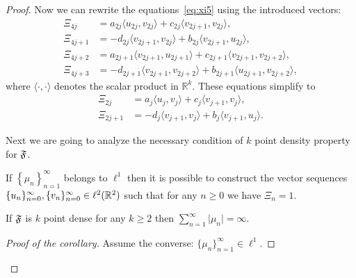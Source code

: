 \begin{proof}
      Now we can rewrite the equations~\eqref{eq:xi5} using the introduced vectors:
      \begin{align*}
        \Xi_{4j} &= a_{2j} \langle u_{2j}, v_{2j}\rangle + c_{2j} \langle v_{2j+1}, v_{2j}\rangle,\\
        \Xi_{4j + 1} &= -d_{2j} \langle v_{2j+1}, v_{2j}\rangle + b_{2j} \langle v_{2j+1}, u_{2j}\rangle,\\
        \Xi_{4j + 2} &= a_{2j+1} \langle v_{2j+1}, u_{2j+1} \rangle + c_{2j+1} \langle v_{2j+1}, v_{2j+2} \rangle,\\
        \Xi_{4j + 3} &= -d_{2j+1} \langle v_{2j+1}, v_{2j+2}\rangle + b_{2j+1} \langle u_{2j+1}, v_{2j+2} \rangle,
      \end{align*}
        where $\langle\cdot, \cdot\rangle$ denotes the scalar product in $\mathbb{R}^k$.
      These equations simplify to
      \begin{equation}
        \label{eq:vector-eqs}
        \begin{aligned}
          \Xi_{2j} &= a_{j} \langle u_{j}, v_{j} \rangle  + c_{j} \langle v_{j+1}, v_{j} \rangle,\\
          \Xi_{2j + 1} &= -d_{j} \langle v_{j+1}, v_{j} \rangle + b_{j} \langle v_{j+1}, u_{j}\rangle.
        \end{aligned}
      \end{equation}

      Next we are going to analyze the necessary condition of $k$ point density property for $\mathfrak{F}$.
      \begin{prop}
        \label{prop:2pd}
        If $\left\{\mu_n\right\}_{n=1}^\infty$ belongs to $\ell^1$ then it is possible to construct
          the vector sequences $\{{u}_n\}_{n=0}^\infty, \{{v}_n\}_{n=0}^\infty \in \ell^2(\mathbb{R}^2)$ such that for any $n \geq 0$ we have $\Xi_n = 1$.
      \end{prop}
      \begin{corol}
        \label{corol:2density}
        If $\mathfrak{F}$ is $k$ point dense for any $k \geq 2$ then $\sum_{n=1}^\infty \lvert\mu_n\rvert = \infty$.
      \end{corol}
      \begin{proof}[Proof of the corollary]
        Assume the converse: $\{\mu_n\}_{n=1}^\infty \in \ell^1$.


\end{proof}
\end{proof}
